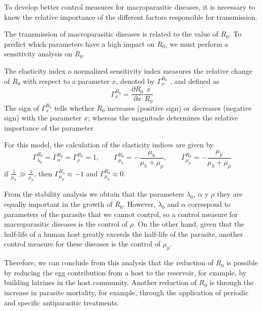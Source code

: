 \documentclass[12pt,a4paper]{article}
\theoremstyle{plain}%
\theoremstyle{definition}
\theoremstyle{remark}
\begin{document}
	{\color{red}
		To develop better control measures for macroparasitic diseases, it is necessary to know the relative importance of the different factors responsible for transmission.
		
		The transmission of macroparasitic diseases is related to the value of $R_0$. To predict which parameters have a high impact on $R_0$, we must perform a sensitivity analysis on $R_0$.	
		
		The elasticity index o normalized sensitivity index measures the relative change of $R_0$ with respect to a parameter $x$, denoted by $\Gamma^{R_0}_{x}$ , and defined as
		\begin{equation}
		\Gamma^{R_0}_{x}=\dfrac{\partial R_0}{\partial x} \dfrac{x}{R_0}
		\end{equation}
		The sign of $\Gamma^{R_0}_{x}$ tells whether $R_0$ increases (positive sign) or decreases (negative sign) with the parameter $x$; whereas the magnitude determines the relative importance of the parameter.
		
		For this model, the calculation of the elasticity indices are given by	
		\begin{equation}
		\Gamma^{R_0}_{\lambda_0}=\Gamma^{R_0}_{\alpha}=\Gamma^{R_0}_{\rho}=1, 
		\qquad \Gamma^{R_0}_{\mu_h}=-\dfrac{\mu_h}{\mu_{h}+\mu_p},
		\qquad \Gamma^{R_0}_{\mu_p}=-\dfrac{\mu_p}{\mu_{h}+\mu_p}
		\end{equation}
		if $\frac{1}{\mu_h} \gg \frac{1}{\mu_p}$, then $\Gamma^{R_0}_{\mu_p}\approx -1$
		and 
		$\Gamma^{R_0}_{\mu_h}\approx 0$.
		
		From the stability analysis we obtain that the parameters $\lambda_0$, $\alpha$ y $\rho$ 
		they are equally important in the growth of $R_0$.
		However, $\lambda_0$ and $\alpha$ correspond to parameters of the parasite that we cannot control, so a control measure for macroparasitic diseases is the control of $\rho$. 
		On the other hand, given that the half-life of a human host greatly exceeds the half-life of the parasite, another control measure for these diseases is the control of $\mu_p$.
		
		Therefore, we can conclude from this analysis that the reduction of $R_0$ 
		is possible by reducing
		the egg contribution from a host to the reservoir, for example, by building latrines in the host community.
		Another reduction of $R_0$ is through the increase in parasite mortality, for example, through the application of periodic and specific antiparasitic treatments.
		
	}
\end{document}
